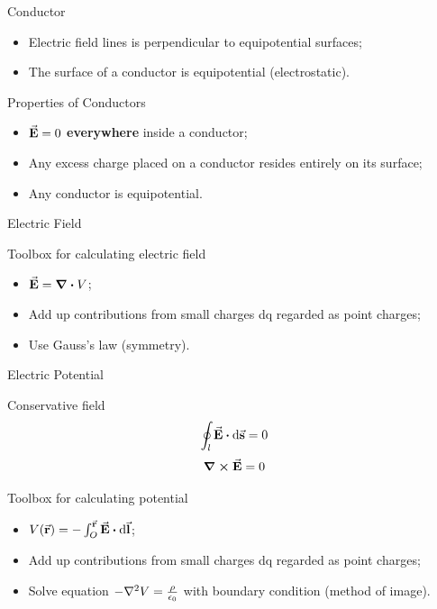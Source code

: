 \documentclass{beamer}
\begin{document}
\begin{frame}{Conductor}
    \begin{itemize}
        \item Electric field lines is perpendicular to equipotential surfaces;
        \item The surface of a conductor is equipotential (electrostatic).
    \end{itemize}
    \vspace{1em}
    \begin{beamerboxesrounded}[shadow=true]{Properties of Conductors}
        \begin{itemize}
            \item $\va{E} = 0$ \textbf{everywhere} inside a conductor;
            \item Any excess charge placed on a conductor resides entirely on its surface;
            \item Any conductor is equipotential.
        \end{itemize}
    \end{beamerboxesrounded}
\end{frame}


\begin{frame}{Electric Field}
    \begin{block}{Toolbox for calculating electric field}
        \begin{itemize}
            \item $\va{E} = \div{V}$;
            \item Add up contributions from small charges dq regarded as point charges;
            \item Use Gauss's law (symmetry).
        \end{itemize}
    \end{block}
\end{frame}

\begin{frame}{Electric Potential}
    \begin{block}{Conservative field}
        \begin{equation}
            \oint_l \va{E} \vdot \dd{\va{s}} = 0
        \end{equation}
        \begin{equation}
            \curl{\va{E}} = 0
        \end{equation}
    \end{block}

    \begin{block}{Toolbox for calculating potential}
        \begin{itemize}
            \item $V(\va{r}) = -\int_O^{\va{r}} \va{E} \vdot \dd{\va{l}}$;
            \item Add up contributions from small charges dq regarded as point charges;
            \item Solve equation $- \laplacian{V} = \frac{\rho}{\epsilon_0}$ with boundary condition (method of image).
        \end{itemize}
    \end{block}
\end{frame}
\end{document}
